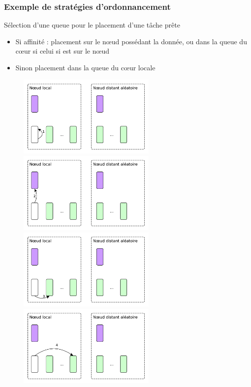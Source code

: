 \documentclass[xcolor={usenames,dvipsnames,svgnames,table}, aspectratio=43]{beamer}
\begin{document}
\begin{frame}
\frametitle{Exemple de stratégies d'ordonnancement}

\vspace{0.3cm}
Sélection d'une queue pour le placement d'une tâche prête
\begin{itemize}
  \item Si affinité : placement sur le nœud possédant la donnée, ou dans la queue du cœur si celui si est sur le nœud
  \item Sinon placement dans la queue du cœur locale
\end{itemize}
\vspace{0.5cm}

\begin{figure}
   {%
    \includegraphics[width=0.6\textwidth]{graph/steal_strategies_anim_1.pdf}%
  }%
   {%
    \includegraphics[width=0.6\textwidth]{graph/steal_strategies_anim_2.pdf}%
  }%
   {%
    \includegraphics[width=0.6\textwidth]{graph/steal_strategies_anim_3.pdf}%
  }%
   {%
    \includegraphics[width=0.6\textwidth]{graph/steal_strategies_anim_4.pdf}%
}
\end{figure}
\end{frame}
\end{document}

